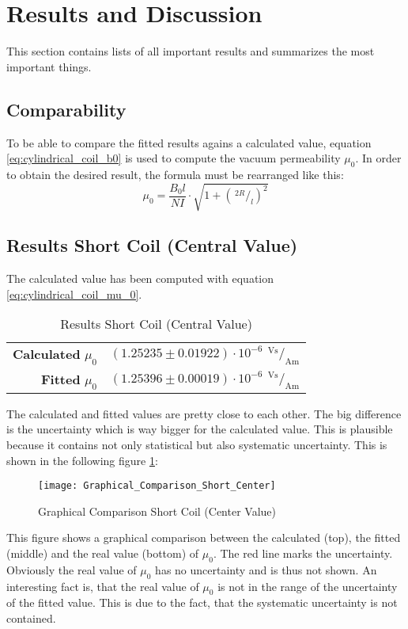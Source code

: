 \section{Results and Discussion}
\label{sec:Results_and_Discussion}
This section contains lists of all important results and summarizes the most important things.

\subsection{Comparability}
\label{subsec:Comparability}
To be able to compare the fitted results agains a calculated value, equation \ref{eq:cylindrical_coil_b0} is used to compute the vacuum permeability $\mu_0$. In order to obtain the desired result, the formula must be rearranged like this:
\begin{equation}
\mu_0=\frac{B_0l}{NI}\cdot\sqrt{1+(\,^{2R}\!/_{l})^2}
\label{eq:cylindrical_coil_mu_0}
\end{equation}

\subsection{Results Short Coil (Central Value)}
\label{subsec:Results_Short_Coil_Central}
The calculated value has been computed with equation \ref{eq:cylindrical_coil_mu_0}.
\begin{table}[H]
	\centering
	\renewcommand{\arraystretch}{1.3}
	\begin{tabular}{r l}
		\hline
		\textbf{Calculated} $\mu_0$ & $(1.25235\pm0.01922)\cdot10^{-6}\ \,^\text{Vs}\!/_\text{Am}$ \\
		\textbf{Fitted} $\mu_0$ & $(1.25396\pm0.00019)\cdot10^{-6}\ \,^\text{Vs}\!/_\text{Am}$ \\ \hline
	\end{tabular}
	\caption{Results Short Coil (Central Value)}
	\label{tab:Results_Short_Coil_Central}
\end{table}
The calculated and fitted values are pretty close to each other. The big difference is the uncertainty which is way bigger for the calculated value. This is plausible because it contains not only statistical but also systematic uncertainty. This is shown in the following figure \ref{fig:Graphical_Comparison_Short_Center}:
\begin{figure}[H]
	\centering
	\texttt{[image: Graphical\_Comparison\_Short\_Center]}
	\caption{Graphical Comparison Short Coil (Center Value)}
	\label{fig:Graphical_Comparison_Short_Center}
\end{figure}
This figure shows a graphical comparison between the calculated (top), the fitted (middle) and the real value (bottom) of $\mu_0$. The red line marks the uncertainty. Obviously the real value of $\mu_0$ has no uncertainty and is thus not shown. An interesting fact is, that the real value of $\mu_0$ is not in the range of the uncertainty of the fitted value. This is due to the fact, that the systematic uncertainty is not contained.
\newpage
